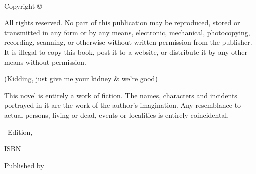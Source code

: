 
{\small
\setlength{\parindent}{0em}\setlength{\parskip}{1em}

~

\vfill

Copyright \copyright{} \startyear\,-\, \editionyear\, \authorname

All rights reserved. No part of this publication may be reproduced, stored or transmitted in any form or by any means, electronic, mechanical, photocopying, recording, scanning, or otherwise without written permission from the publisher. It is illegal to copy this book, post it to a website, or distribute it by any other means without permission.

(Kidding, just give me your kidney \& we're good)

This novel is entirely a work of fiction. The names, characters and incidents portrayed in it are the work of the author’s imagination. Any resemblance to actual persons, living or dead, events or localities is entirely coincidental.

\editionnum\, Edition, \editionyear{}

ISBN \isbn{}  %

Published by \publisher{}
}
